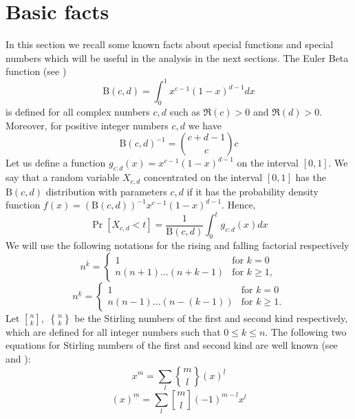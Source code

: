 \documentclass[final,5p,times,twocolumn]{elsarticle_mod}
\newcommand{\EBeta}[2]{\mathrm{B}(#1,#2)}
\begin{document}
\section{Basic facts}
\label{sec:Introduction}
In this section we recall some known facts about special functions and special numbers which will be useful in the analysis
in the next sections. The Euler Beta function (see \cite{NIST})
\begin{equation}
\label{eq:beta}
\EBeta{c}{d} = \int_0^1 x^{c-1}(1-x)^{d-1} dx
\end{equation}
is defined for all complex numbers $c,d$ 
such as $\Re(c)>0$ and $\Re(d)>0$. 
Moreover, for positive integer numbers $c,d$ we have
\begin{equation}
\label{Emult}
\EBeta{c}{d}^{-1}=\binom{c+d-1}{c}c
\end{equation}
Let us define a function $g_{c:d}(x)=x^{c-1}(1-x)^{d-1}$ on the interval $[0,1].$
We say that a random variable $X_{c,d}$ concentrated on the interval
$[0,1]$ has the $\EBeta{c}{d}$ distribution with parameters
$c, d$ if it has the probability density function
$f(x)=(\EBeta{c}{d})^{-1}x^{c-1}(1-x)^{d-1}.$ Hence,
\begin{equation}
\label{probal_eq}
\Pr[X_{c,d} < t] = \frac{1}{\EBeta{c}{d}}\int_0^t  g_{c:d}(x)dx
\end{equation}
We will  use the following notations
for the rising and falling factorial respectively \cite{concrete_1994}
$$n^{\overline{k}} = \begin{cases} 1 &\mbox{for } k=0 \\
n(n+1)\dots(n+k-1) & \mbox{for } k\ge 1, \end{cases}$$
$$n^{\underline{k}} = \begin{cases} 1 &\mbox{for } k=0 \\
n(n-1)\dots(n-(k-1)) & \mbox{for } k\ge 1. \end{cases}$$
Let ${ n\brack k},$  ${n\brace k}$ be the Stirling numbers of the first and second kind respectively, which are
defined for all integer numbers such that $0\le k \le n.$ 
The following two equations for Stirling numbers of the first and second kind are well known  (see \cite[identity 6.10]{concrete_1994} and \cite[identity 6.13]{concrete_1994}):
\begin{equation}
\label{eq:stirling}
x^{m}=\sum_{l}{m\brace l}(x)^{\underline{l}}
\end{equation}
\begin{equation}
\label{eq:stirling2}
(x)^{\underline{m}}=\sum_{l}{ m\brack l}(-1)^{m-l}x^{l}
\end{equation}
\end{document}
